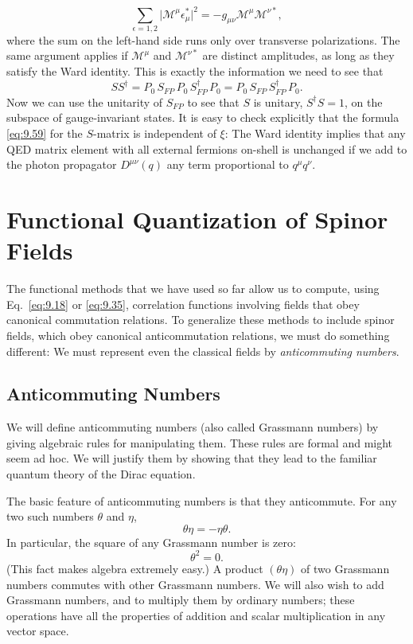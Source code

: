\begin{equation}
  \sum_{\epsilon=1,2} \bigl| \mathcal{M}^\mu\epsilon^{*}_\mu \bigr|^2
  = -g_{\mu\nu}\mathcal{M}^\mu\mathcal{M}^{\nu*} ,
  \label{eq:9.60}
\end{equation}
where the sum on the left-hand side runs only over transverse polarizations.
The same argument applies if $\mathcal{M}^\mu$ and $\mathcal{M}^{\nu*}$ are
distinct amplitudes, as long as they satisfy the Ward identity.  This is
exactly the information we need to see that
\begin{equation}
  SS^{\dagger} = P_0\,S_{FP}\,P_0\,S_{FP}^{\dagger}\,P_0
    = P_0\,S_{FP}\,S_{FP}^{\dagger}\,P_0 .
  \label{eq:9.61}
\end{equation}
Now we can use the unitarity of $S_{FP}$ to see that $S$ is unitary,
$S^{\dagger}S = 1$, on the subspace of gauge-invariant states.  It is easy to
check explicitly that the formula \eqref{eq:9.59} for the $S$-matrix is
independent of $\xi$: The Ward identity implies that any QED matrix element
with all external fermions on-shell is unchanged if we add to the photon
propagator $D^{\mu\nu}(q)$ any term proportional to $q^\mu q^\nu$.

\section{Functional Quantization of Spinor Fields}

The functional methods that we have used so far allow us to compute, using
Eq.~\eqref{eq:9.18} or \eqref{eq:9.35}, correlation functions involving fields
that obey canonical commutation relations.  To generalize these methods to
include spinor fields, which obey canonical anticommutation relations, we must
do something different: We must represent even the classical fields by
\emph{anticommuting numbers}.

\subsection{Anticommuting Numbers}

We will define anticommuting numbers (also called Grassmann numbers) by giving
algebraic rules for manipulating them.  These rules are formal and might seem
ad hoc.  We will justify them by showing that they lead to the familiar
quantum theory of the Dirac equation.

The basic feature of anticommuting numbers is that they anticommute.  For any
two such numbers $\theta$ and $\eta$,
\begin{equation}
  \theta\eta = -\eta\theta .
  \label{eq:9.62}
\end{equation}
In particular, the square of any Grassmann number is zero:
\begin{equation}
  \theta^2 = 0 .
\end{equation}
(This fact makes algebra extremely easy.)  A product $(\theta\eta)$ of two
Grassmann numbers commutes with other Grassmann numbers.  We will also wish to
add Grassmann numbers, and to multiply them by ordinary numbers; these
operations have all the properties of addition and scalar multiplication in
any vector space.

